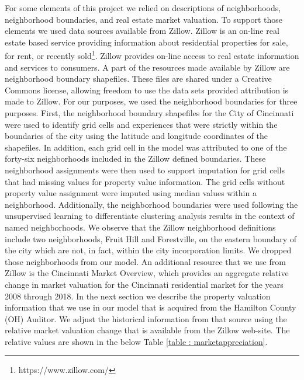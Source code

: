 \documentclass{llncs}
\begin{document}
For some elements of this project we relied on descriptions of neighborhoods, neighborhood boundaries, and real estate market valuation. To support those elements we used data sources available from Zillow. Zillow is an on-line real estate based service providing information about residential properties for sale, for rent, or recently sold\footnote{https://www.zillow.com/}. Zillow provides on-line access to real estate information and services to consumers. A part of the resources made available by Zillow are neighborhood boundary shapefiles. These files are shared under a Creative Commons license, allowing freedom to use the data sets provided attribution is made to Zillow. For our purposes, we used the neighborhood boundaries for three purposes. First, the neighborhood boundary shapefiles for the City of Cincinnati were used to identify grid cells and experiences that were strictly within the boundaries of the city using the latitude and longitude coordinates of the shapefiles. In addition, each grid cell in the model was attributed to one of the forty-six neighborhoods included in the Zillow defined boundaries. These neighborhood assignments were then used to support imputation for grid cells that had missing values for property value information. The grid cells without property value assignment were imputed using median values within a neighborhood. Additionally, the neighborhood boundaries were used following the unsupervised learning to differentiate clustering analysis results in the context of named neighborhoods. We observe that the Zillow neighborhood definitions include two neighborhoods, Fruit Hill and Forestville, on the eastern boundary of the city which are not, in fact, within the city incorporation limits. We dropped those neighborhoods from our model. An additional resource that we use from Zillow is the Cincinnati Market Overview, which provides an aggregate relative change in market valuation for the Cincinnati residential market for the years 2008 through 2018.  In the next section we describe the property valuation information that we use in our model that is acquired from the Hamilton County (OH) Auditor. We adjust the historical information from that source using the relative market valuation change that is available from the Zillow web-site. The relative values are shown in the below Table \ref{table : marketappreciation}.
\end{document}
